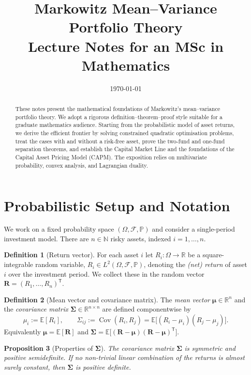 \documentclass[11pt]{article}
\title{\textbf{Markowitz Mean--Variance Portfolio Theory} \\[0.4em]
       \large Lecture Notes for an MSc in Mathematics}
\author{}
\date{\today}
\theoremstyle{definition}
\newtheorem{definition}{Definition}[section]
\theoremstyle{plain}
\newtheorem{proposition}[definition]{Proposition}
\newcommand{\R}{\mathbb{R}}
\newcommand{\E}{\mathbb{E}}
\newcommand{\Cov}{\operatorname{Cov}}
\newcommand{\bmu}{\bm{\mu}}
\newcommand{\bSigma}{\bm{\Sigma}}
\newcommand{\T}{^{\mathsf{T}}}
\begin{document}
\maketitle

\begin{abstract}
\noindent These notes present the mathematical foundations of Markowitz's
mean--variance portfolio theory. We adopt a rigorous definition--theorem--proof
style suitable for a graduate mathematics audience. Starting from the probabilistic
model of asset returns, we derive the efficient frontier by solving constrained
quadratic optimisation problems, treat the cases with and without a risk-free
asset, prove the two-fund and one-fund separation theorems, and establish the
Capital Market Line and the foundations of the Capital Asset Pricing Model
(CAPM). The exposition relies on multivariate probability, convex analysis,
and Lagrangian duality.
\end{abstract}

\tableofcontents

\section{Probabilistic Setup and Notation}

We work on a fixed probability space $(\Omega, \mathcal{F}, \mathbb{P})$ and
consider a single-period investment model. There are $n \in \mathbb{N}$ risky
assets, indexed $i = 1, \dots, n$.

\begin{definition}[Return vector]
For each asset $i$ let $R_i : \Omega \to \R$ be a square-integrable random
variable, $R_i \in L^2(\Omega, \mathcal{F}, \mathbb{P})$, denoting the
\emph{(net) return} of asset $i$ over the investment period. We collect these in
the random vector $\bm{R} = (R_1, \dots, R_n)\T$.
\end{definition}

\begin{definition}[Mean vector and covariance matrix]
The \emph{mean vector} $\bmu \in \R^n$ and the \emph{covariance matrix}
$\bSigma \in \R^{n \times n}$ are defined componentwise by
\[
\mu_i := \E[R_i], \qquad
\Sigma_{ij} := \Cov(R_i, R_j) = \E\big[(R_i - \mu_i)(R_j - \mu_j)\big].
\]
Equivalently $\bmu = \E[\bm{R}]$ and
$\bSigma = \E\big[(\bm{R} - \bmu)(\bm{R} - \bmu)\T\big]$.
\end{definition}

\begin{proposition}[Properties of $\bSigma$]\label{prop:psd}
The covariance matrix $\bSigma$ is symmetric and positive semidefinite. If no
non-trivial linear combination of the returns is almost surely constant, then
$\bSigma$ is positive definite.
\end{proposition}
\end{document}
